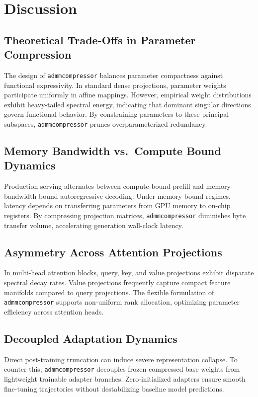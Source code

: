 \section{Discussion}

\subsection{Theoretical Trade-Offs in Parameter Compression}
The design of \texttt{admmcompressor} balances parameter compactness against functional expressivity. In standard dense projections, parameter weights participate uniformly in affine mappings. However, empirical weight distributions exhibit heavy-tailed spectral energy, indicating that dominant singular directions govern functional behavior. By constraining parameters to these principal subspaces, \texttt{admmcompressor} prunes overparameterized redundancy.

\subsection{Memory Bandwidth vs.\ Compute Bound Dynamics}
Production serving alternates between compute-bound prefill and memory-bandwidth-bound autoregressive decoding. Under memory-bound regimes, latency depends on transferring parameters from GPU memory to on-chip registers. By compressing projection matrices, \texttt{admmcompressor} diminishes byte transfer volume, accelerating generation wall-clock latency.

\subsection{Asymmetry Across Attention Projections}
In multi-head attention blocks, query, key, and value projections exhibit disparate spectral decay rates. Value projections frequently capture compact feature manifolds compared to query projections. The flexible formulation of \texttt{admmcompressor} supports non-uniform rank allocation, optimizing parameter efficiency across attention heads.

\subsection{Decoupled Adaptation Dynamics}
Direct post-training truncation can induce severe representation collapse. To counter this, \texttt{admmcompressor} decouples frozen compressed base weights from lightweight trainable adapter branches. Zero-initialized adapters ensure smooth fine-tuning trajectories without destabilizing baseline model predictions.

